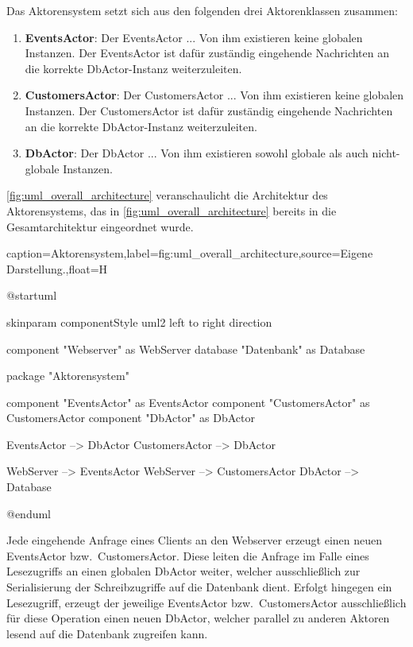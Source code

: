 Das Aktorensystem setzt sich aus den folgenden drei Aktorenklassen zusammen:
\begin{enumerate}
    \item \textbf{EventsActor}: Der EventsActor ... Von ihm existieren keine globalen Instanzen. Der EventsActor ist dafür zuständig eingehende Nachrichten an die korrekte DbActor-Instanz weiterzuleiten.
    \item \textbf{CustomersActor}: Der CustomersActor ... Von ihm existieren keine globalen Instanzen. Der CustomersActor ist dafür zuständig eingehende Nachrichten an die korrekte DbActor-Instanz weiterzuleiten.
    \item \textbf{DbActor}: Der DbActor ... Von ihm existieren sowohl globale als auch nicht-globale Instanzen.
\end{enumerate}

\autoref{fig:uml_overall_architecture} veranschaulicht die Architektur des Aktorensystems, das in \autoref{fig:uml_overall_architecture} bereits in die Gesamtarchitektur eingeordnet wurde.

\begin{dhbwfigure}{caption=Aktorensystem,label=fig:uml_overall_architecture,source={Eigene Darstellung.},float=H}
    \begin{plantuml}
        @startuml

            skinparam componentStyle uml2
            left to right direction

            component "Webserver" as WebServer
            database "Datenbank" as Database

            package "Aktorensystem" {
                component "EventsActor" as EventsActor
                component "CustomersActor" as CustomersActor
                component "DbActor" as DbActor

                
                EventsActor --> DbActor
                CustomersActor --> DbActor
            }

            WebServer --> EventsActor
            WebServer --> CustomersActor
            DbActor --> Database

        @enduml
    \end{plantuml}
\end{dhbwfigure}

Jede eingehende Anfrage eines Clients an den Webserver erzeugt einen neuen EventsActor bzw.\ CustomersActor.
Diese leiten die Anfrage im Falle eines Lesezugriffs an einen globalen DbActor weiter, welcher ausschließlich zur Serialisierung der Schreibzugriffe auf die Datenbank dient.
Erfolgt hingegen ein Lesezugriff, erzeugt der jeweilige EventsActor bzw.\ CustomersActor ausschließlich für diese Operation einen neuen DbActor, welcher parallel zu anderen Aktoren lesend auf die Datenbank zugreifen kann.
